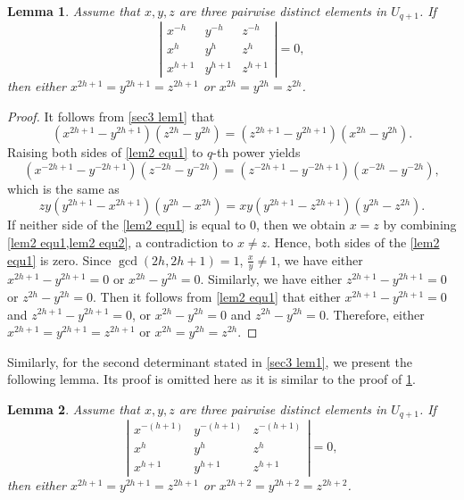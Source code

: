 \documentclass[10pt]{article}%
\newtheorem{lemma}{Lemma}
\begin{document}
	\begin{lemma}\label{sec3 lem2}
		Assume that $x,y,z$ are three pairwise distinct elements in $U_{q+1}$. If
		\begin{equation*}
			\left|\begin{array}{lll}
				x^{-h} & y^{-h} & z^{-h}\\ x^h & y^h & z^h\\ x^{h+1} & y^{h+1} & z^{h+1}
			\end{array}\right|
			= 0,
		\end{equation*}
		then either $x^{2h+1} = y^{2h+1} = z^{2h+1}$ or $x^{2h} = y^{2h} = z^{2h}$.
	\end{lemma}
	\begin{proof}
		It follows from \cref{sec3 lem1} that
		\begin{equation}\label{lem2 equ1}
			\left(x^{2h+1}-y^{2h+1}\right)\left(z^{2h}-y^{2h}\right)=\left(z^{2h+1}-y^{2h+1}\right)\left(x^{2h}-y^{2h}\right).
		\end{equation}
		Raising both sides of \cref{lem2 equ1} to $q$-th power yields
		\begin{equation*}
			\left(x^{-2h+1}-y^{-2h+1}\right)\left(z^{-2h}-y^{-2h}\right)=\left(z^{-2h+1}-y^{-2h+1}\right)\left(x^{-2h}-y^{-2h}\right),
		\end{equation*}
		which is the same as
		\begin{equation}\label{lem2 equ2}
			zy\left(y^{2h+1}-x^{2h+1}\right)\left(y^{2h}-x^{2h}\right)=xy\left(y^{2h+1}-z^{2h+1}\right)\left(y^{2h}-z^{2h}\right).
		\end{equation}
		If neither side of the \cref{lem2 equ1} is equal to 0, then we obtain $x=z$ by combining \cref{lem2 equ1,lem2 equ2}, a contradiction to $x\ne z$. Hence, both sides of the \cref{lem2 equ1} is zero. Since $\gcd(2h,2h+1)=1$, $\frac{x}{y}\ne1$, we have either $x^{2h+1} - y^{2h+1} = 0$ or $x^{2h}-y^{2h} = 0$. Similarly, we have either $z^{2h+1} - y^{2h+1} = 0$ or $z^{2h}-y^{2h} = 0$. Then it follows from \cref{lem2 equ1} that either $x^{2h+1} - y^{2h+1} = 0$ and $z^{2h+1} - y^{2h+1} = 0$, or $x^{2h}-y^{2h} = 0$ and $z^{2h}-y^{2h} = 0$. Therefore, either $x^{2h+1} = y^{2h+1} = z^{2h+1}$ or $x^{2h} = y^{2h} = z^{2h}$.
	\end{proof}
	
	Similarly, for the second determinant stated in \cref{sec3 lem1}, we present the following lemma. Its proof is omitted here as it is similar to the proof of \cref{sec3 lem2}.
	\begin{lemma}
		\label{sec3 lem3}
		Assume that $x,y,z$ are three pairwise distinct elements in $U_{q+1}$. If 
		\begin{equation*}
			\left|\begin{array}{lll}x^{-(h+1)} & y^{-(h+1)} & z^{-(h+1)}\\ x^h & y^h & z^h\\ x^{h+1} & y^{h+1} & z^{h+1}\end{array}\right|
			= 0,
		\end{equation*}
		then either $x^{2h+1} = y^{2h+1} = z^{2h+1}$ or $x^{2h+2} = y^{2h+2} = z^{2h+2}$.
	\end{lemma}
	
\end{document}
